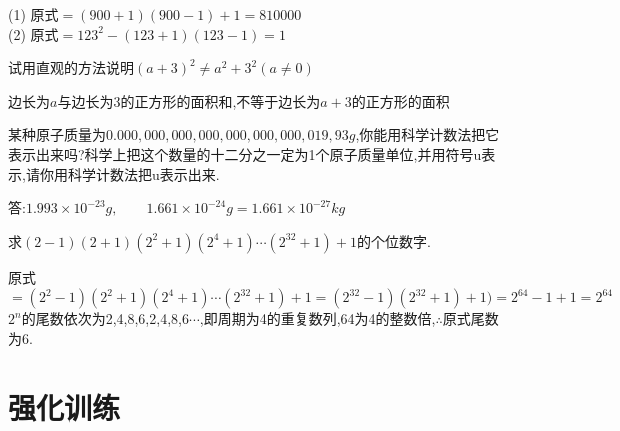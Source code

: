 \documentclass[cn,blue,12pt]{elegantbook}
\begin{document}
\begin{xiti}[resume]
\begin{multicols}{3}
        \end{multicols}
\begin{solution}
            (1) 原式\(=(900+1)(900-1)+1=810000\)\\
            (2) 原式\(=123^2-(123+1)(123-1)=1\)
\end{solution}
    \item 试用直观的方法说明\((a+3)^2 \ne a^2 + 3^2(a\ne 0)\)
\begin{solution}
            边长为\(a\)与边长为\(3\)的正方形的面积和,不等于边长为\(a+3\)的正方形的面积\\
\end{solution}
    \item 某种原子质量为\(0.000,000,000,000,000,000,000,019,93g\),你能用科学计数法把它表示出来吗?科学上把这个数量的十二分之一定为1个原子质量单位,并用符号u表示,请你用科学计数法把u表示出来.
\begin{solution}
            答:\(1.993\times 10^{-23}g,\qquad 1.661\times 10^{-24}g=1.661\times 10^{-27}kg\)\\
\end{solution}
    \item 求\((2-1)(2+1)(2^2+1)(2^4+1)\cdots (2^{32}+1)+1\)的个位数字.
\begin{solution}
            原式\(=(2^2-1)(2^2+1)(2^4+1) \cdots (2^{32}+1)+1=(2^{32}-1)(2^{32}+1)+1)=2^{64}-1+1=2^{64}\)\\
            \(2^n\)的尾数依次为2,4,8,6,2,4,8,6\(\cdots\),即周期为4的重复数列,64为4的整数倍,\(\therefore \)原式尾数为6.
\end{solution}
    \end{xiti}

    \section{强化训练}%
\end{document}
